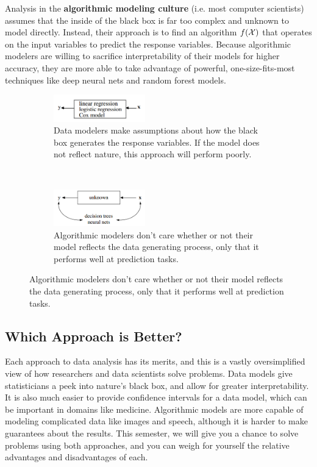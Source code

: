 \documentclass{discussion}
\begin{document}
Analysis in the \textbf{algorithmic modeling culture} (i.e. most computer scientists) assumes that the inside of the black box is far too complex and unknown to model directly.  Instead, their approach is to find an algorithm $f(\mathcal{X})$ that operates on the input variables to predict the response variables.  Because algorithmic modelers are willing to sacrifice interpretability of their models for higher accuracy, they are more able to take advantage of powerful, one-size-fits-most techniques like deep neural nets and random forest models.

\begin{figure}[h!]
    \centering
    \begin{subfigure}[t]{0.5\textwidth}
        \centering
        \includegraphics[width=150px]{images/data-model}
        \caption{Data modelers make assumptions about how the black box generates the response variables.  If the model does not reflect nature, this approach will perform poorly.}
    \end{subfigure}%
    ~ 
    \begin{subfigure}[t]{0.5\textwidth}
        \centering
        \includegraphics[width=150px]{images/algorithmic-model}
        \caption{Algorithmic modelers don't care whether or not their model reflects the data generating process, only that it performs well at prediction tasks.}
    \end{subfigure}
\end{figure}

\subsection*{Which Approach is Better?}

Each approach to data analysis has its merits, and this is a vastly oversimplified view of how researchers and data scientists solve problems.  Data models give statisticians a peek into nature's black box, and allow for greater interpretability.  It is also much easier to provide confidence intervals for a data model, which can be important in domains like medicine.  Algorithmic models are more capable of modeling complicated data like images and speech, although it is harder to make guarantees about the results.  This semester, we will give you a chance to solve problems using both approaches, and you can weigh for yourself the relative advantages and disadvantages of each.
\end{document}
